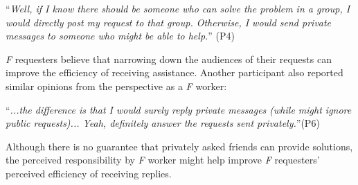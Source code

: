 ``\emph{Well, if I know there should be someone who can solve the problem in a group, 
I would directly post my request to that group. 
Otherwise, I would send private messages to someone who might be able to help.}'' (P4)

\emph{F} requesters believe that narrowing down the audiences of their requests can improve the efficiency of receiving assistance.
Another participant also reported similar opinions from the perspective as a \emph{F} worker:

``\emph{...the difference is that I would surely reply private messages (while might ignore public requests)...
Yeah, definitely answer the requests sent privately.}''(P6)

Although there is no guarantee that privately asked friends can provide solutions, 
the perceived responsibility by \emph{F} worker might help improve \emph{F} requesters' perceived efficiency of receiving replies.


